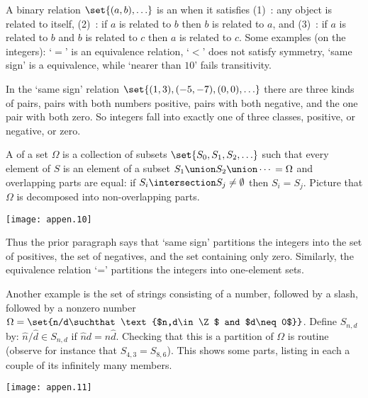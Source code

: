 A binary relation \( \set{(a,b),\ldots } \)
is an 
when it satisfies
(1)~: 
     any object is related to itself,
(2)~: 
     if \( a \) is related to \( b \) then
     \( b \) is related to \( a \), and
(3)~:
     if \( a \) is related to \( b \) and \( b \) is
     related to \( c \) then \( a \) is related to \( c \).
Some examples (on the integers): `\( = \)' is an equivalence relation,
`\( < \)' does not satisfy symmetry,
`same sign' is a equivalence, while `nearer than \( 10 \)' fails transitivity.






In the `same sign' relation \( \set{ (1,3),(-5,-7),(0,0),\ldots} \)
there are three kinds of pairs, pairs with both numbers positive,
pairs with both negative, and the one pair with both zero.
So integers fall into exactly one of three classes, positive, or negative,
or zero.

A  
of a set \( \Omega \) is a collection of subsets
\( \set{S_0,S_1,S_2,\ldots} \) such that
every element of \( S \) is an element of a subset
\( S_1\union S_2\union \cdots{} = \Omega \) and overlapping parts are equal:
if \( S_i\intersection S_j\neq\emptyset \) then $S_i=S_j$.
Picture that \( \Omega \) is decomposed into non-overlapping parts.
\begin{center}
  \texttt{[image: appen.10]}
\end{center}
Thus the prior paragraph says that `same sign' partitions
the integers into the set of positives, the set of negatives, and 
the set containing only zero.
Similarly, the equivalence relation `=' partitions the integers into
one-element sets.

Another example is the set of strings consisting of a number, followed
by a slash,
followed by a nonzero number
$\Omega=\set{n/d\suchthat \text{$n,d\in\Z$ and $d\neq 0$}}$.
Define $S_{n,d}$ by: $\hat{n}/\hat{d}\in S_{n,d}$ if 
$\hat{n}d=n\hat{d}$.
Checking that this is a partition of $\Omega$ is routine
(observe for instance that $S_{4,3}=S_{8,6}$).
This shows some parts, listing in each a couple of its infinitely many members. 
\begin{center}
  \texttt{[image: appen.11]}
\end{center}

